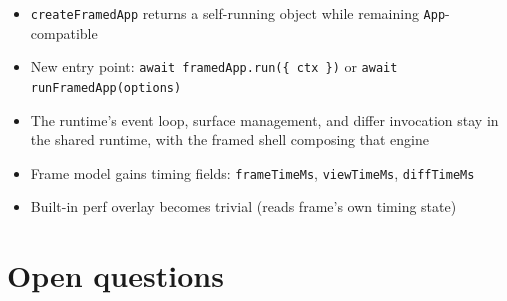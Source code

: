 \begin{itemize}
\tightlist
\item
  \texttt{c\allowbreak{}r\allowbreak{}e\allowbreak{}a\allowbreak{}t\allowbreak{}e\allowbreak{}F\allowbreak{}r\allowbreak{}a\allowbreak{}m\allowbreak{}e\allowbreak{}d\allowbreak{}A\allowbreak{}p\allowbreak{}p} returns a self-running object while remaining \texttt{A\allowbreak{}p\allowbreak{}p}-compatible
\item
  New entry point: \texttt{a\allowbreak{}w\allowbreak{}a\allowbreak{}i\allowbreak{}t\allowbreak{} \allowbreak{}f\allowbreak{}r\allowbreak{}a\allowbreak{}m\allowbreak{}e\allowbreak{}d\allowbreak{}A\allowbreak{}p\allowbreak{}p\allowbreak{}.\allowbreak{}r\allowbreak{}u\allowbreak{}n\allowbreak{}(\allowbreak{}\{\allowbreak{} \allowbreak{}c\allowbreak{}t\allowbreak{}x\allowbreak{} \allowbreak{}\}\allowbreak{})} or \texttt{a\allowbreak{}w\allowbreak{}a\allowbreak{}i\allowbreak{}t\allowbreak{} \allowbreak{}r\allowbreak{}u\allowbreak{}n\allowbreak{}F\allowbreak{}r\allowbreak{}a\allowbreak{}m\allowbreak{}e\allowbreak{}d\allowbreak{}A\allowbreak{}p\allowbreak{}p\allowbreak{}(\allowbreak{}o\allowbreak{}p\allowbreak{}t\allowbreak{}i\allowbreak{}o\allowbreak{}n\allowbreak{}s\allowbreak{})}
\item
  The runtime's event loop, surface management, and differ invocation stay in the shared runtime, with the framed shell composing that engine
\item
  Frame model gains timing fields: \texttt{f\allowbreak{}r\allowbreak{}a\allowbreak{}m\allowbreak{}e\allowbreak{}T\allowbreak{}i\allowbreak{}m\allowbreak{}e\allowbreak{}M\allowbreak{}s}, \texttt{v\allowbreak{}i\allowbreak{}e\allowbreak{}w\allowbreak{}T\allowbreak{}i\allowbreak{}m\allowbreak{}e\allowbreak{}M\allowbreak{}s}, \texttt{d\allowbreak{}i\allowbreak{}f\allowbreak{}f\allowbreak{}T\allowbreak{}i\allowbreak{}m\allowbreak{}e\allowbreak{}M\allowbreak{}s}
\item
  Built-in perf overlay becomes trivial (reads frame's own timing state)
\end{itemize}

\section{Open questions}\label{record-373-open-questions}

